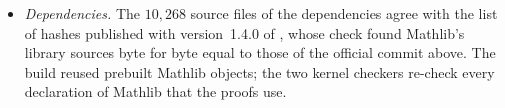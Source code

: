 \begin{itemize}
\begingroup\scriptsize
\begin{verbatim}
'UPD.theorem_A' depends on axioms: [propext, Classical.choice, Quot.sound]
'UPD.corollary_B' depends on axioms: [propext, Classical.choice, Quot.sound]
'UPD.existsUniversal' depends on axioms: [propext, Classical.choice, Quot.sound]
\end{verbatim}
\endgroup
\noindent Apart from the three open proofs of the challenge, no proof uses \texttt{sorry}, and no file declares an axiom or uses \texttt{native\_decide}, \texttt{implemented\_by} or \texttt{extern}.
\item \emph{Dependencies.} The $10{,}268$ source files of the dependencies agree with the list of hashes published with version~1.4.0 of \cite{DM26forget}, whose check found Mathlib's library sources byte for byte equal to those of the official commit above. The build reused prebuilt Mathlib objects; the two kernel checkers re-check every declaration of Mathlib that the proofs use.
\end{itemize}
